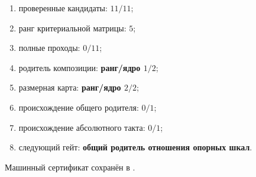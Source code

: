 \begin{protocol}\begin{enumerate}
\item проверенные кандидаты: \textbf{$11/11$};
\item ранг критериальной матрицы: \textbf{$5$};
\item полные проходы: \textbf{$0/11$};
\item родитель композиции: \textbf{ранг/ядро $1/2$};
\item размерная карта: \textbf{ранг/ядро $2/2$};
\item происхождение общего родителя: \textbf{$0/1$};
\item происхождение абсолютного такта: \textbf{$0/1$};
\item следующий гейт: \textbf{общий родитель отношения опорных шкал}.
\end{enumerate}\end{protocol}

Машинный сертификат сохранён в
.